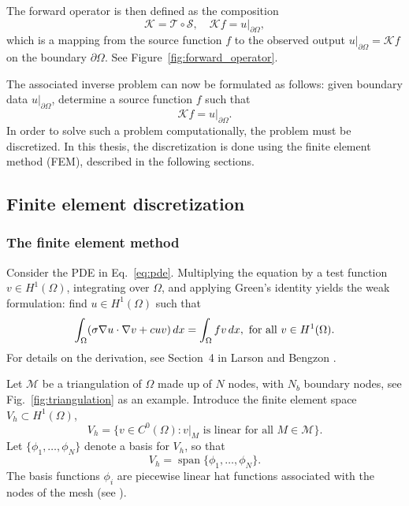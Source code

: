 The forward operator is then defined as the composition
\begin{equation}\label{eq:K}
    \mathcal K = \mathcal T \circ \mathcal S, \quad \mathcal{K} f = u|_{\partial\Omega},
\end{equation}
which is a mapping from the source function $f$ to the observed output $u|_{\partial\Omega} = \mathcal K f$ on the boundary $\partial \Omega$. See Figure~\ref{fig:forward_operator}.

The associated inverse problem can now be formulated as follows: given boundary data $u|_{\partial\Omega}$, determine a source function $f$ such that
\begin{equation}
    \mathcal{K} f = u|_{\partial\Omega}.
\end{equation}
In order to solve such a problem computationally, the problem must be discretized. In this thesis, the discretization is done using the finite element method (FEM), described in the following sections.

\subsection{Finite element discretization}
\subsubsection{The finite element method}

Consider the PDE in Eq.~\eqref{eq:pde}. Multiplying the equation by a test function $v \in H^1(\Omega)$, integrating over $\Omega$, and applying Green's identity yields the weak formulation: find $u \in H^1(\Omega)$ such that
\begin{equation}\label{eq:variational_formulation}
    \int_{\Omega} (\sigma \nabla u \cdot \nabla v + c u v) \, dx = \int_{\Omega} f v \space \, dx,
    \text{ for all } v \in H^1(\Omega).
\end{equation}
For details on the derivation, see Section~4 in Larson and Bengzon \cite{larsonFiniteElementMethod2013}.

Let $\mathcal M$ be a triangulation of $\Omega$ made up of $N$ nodes, with $N_b$ boundary nodes, see Fig.~\ref{fig:triangulation} as an example. Introduce the finite element space $V_h \subset H^1(\Omega)$,
\begin{equation}\label{eq:fem_space}
    V_h = \{v \in C^0(\Omega) : v|_M \text{ is linear for all } M \in \mathcal M \}.
\end{equation}
Let $\{\phi_1, \dots, \phi_N\}$ denote a basis for $V_h$, so that
\begin{equation}
    V_h = \operatorname{span}\{ \phi_1, \dots, \phi_N \}.
\end{equation}
The basis functions $\phi_i$ are piecewise linear hat functions associated with the nodes of the mesh (see \cite[p.~51]{larsonFiniteElementMethod2013}).

